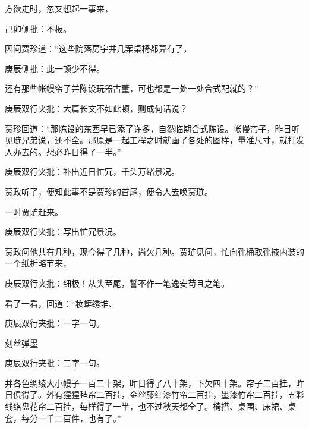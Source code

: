 \begin{parag}


    方欲走时，忽又想起一事来，\begin{note}己卯侧批：不板。\end{note}因问贾珍道：“这些院落房宇并几案桌椅都算有了，\begin{note}庚辰侧批：此一顿少不得。\end{note}还有那些帐幔帘子并陈设玩器古董，可也都是一处一处合式配就的？”\begin{note}庚辰双行夹批：大篇长文不如此顿，则成何话说？\end{note}贾珍回道：“那陈设的东西早已添了许多，自然临期合式陈设。帐幔帘子，昨日听见琏兄弟说，还不全。那原是一起工程之时就画了各处的图样，量准尺寸，就打发人办去的。想必昨日得了一半。”\begin{note}庚辰双行夹批：补出近日忙冗，千头万绪景况。\end{note}贾政听了，便知此事不是贾珍的首尾，便令人去唤贾琏。
\end{parag}


\begin{parag}


    一时贾琏赶来。\begin{note}庚辰双行夹批：写出忙冗景况。\end{note}贾政问他共有几种，现今得了几种，尚欠几种。贾琏见问，忙向靴桶取靴掖内装的一个纸折略节来，\begin{note}庚辰双行夹批：细极！从头至尾，誓不作一笔逸安苟且之笔。\end{note}看了一看，回道：“妆蟒绣堆、\begin{note}庚辰双行夹批：一字一句。\end{note}刻丝弹墨\begin{note}庚辰双行夹批：二字一句。\end{note}并各色绸绫大小幔子一百二十架，昨日得了八十架，下欠四十架。帘子二百挂，昨日俱得了。外有猩猩毡帘二百挂，金丝藤红漆竹帘二百挂，墨漆竹帘二百挂，五彩线络盘花帘二百挂，每样得了一半，也不过秋天都全了。椅搭、桌围、床裙、桌套，每分一千二百件，也有了。”
\end{parag}



